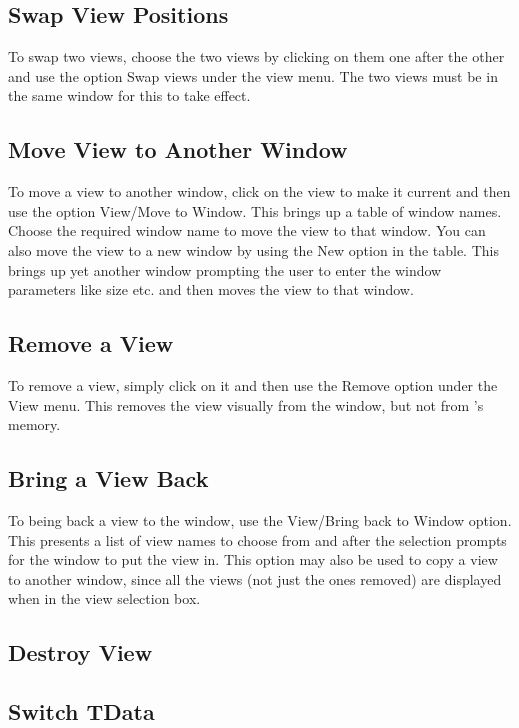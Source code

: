 \subsection{Swap View Positions}

To swap two views, choose the two views by clicking on them one after
the other and use the option Swap views under the view menu. The two
views must be in the same window for this to take effect.

\subsection{Move View to Another Window}

To move a view to another window, click on the view to make it current
and then use the option View/Move to Window. This brings up a table of
window names. Choose the required window name to move the view to that
window. You can also move the view to a new window by using the New
option in the table. This brings up yet another window prompting the
user to enter the window parameters like size etc. and then moves the
view to that window.

\subsection{Remove a View}

To remove a view, simply click on it and then use the Remove option
under the View menu. This removes the view visually from the window,
but not from \Devise's memory.

\subsection{Bring a View Back}

To being back a view to the window, use the View/Bring back to Window
option. This presents a list of view names to choose from and after
the selection prompts for the window to put the view in. This option
may also be used to copy a view to another window, since all the views
(not just the ones removed) are displayed when in the view selection
box.

\subsection{Destroy View}


\subsection{Switch TData}

